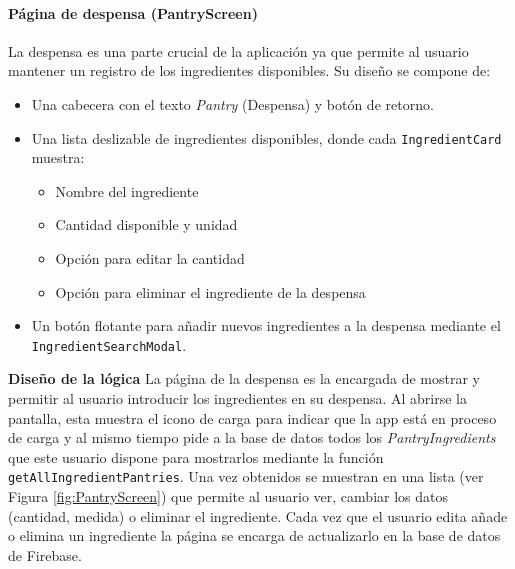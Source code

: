 \documentclass[twoside, openright, 11pt]{report}
\begin{document}
				
				\paragraph{Página de despensa (PantryScreen)}
				La despensa es una parte crucial de la aplicación ya que permite al usuario mantener un registro de los ingredientes disponibles. Su diseño se compone de:
				
				\begin{itemize}
					\item Una cabecera con el texto \textit{Pantry} (Despensa) y botón de retorno.
					\item Una lista deslizable de ingredientes disponibles, donde cada \texttt{IngredientCard} muestra:
					\begin{itemize}
						\item Nombre del ingrediente
						\item Cantidad disponible y unidad
						\item Opción para editar la cantidad
						\item Opción para eliminar el ingrediente de la despensa
					\end{itemize}
					\item Un botón flotante para añadir nuevos ingredientes a la despensa mediante el \texttt{IngredientSearchModal}.
				\end{itemize}
				
				\textbf{Diseño de la lógica}
				La página de la despensa es la encargada de mostrar y permitir al usuario introducir los ingredientes en su despensa. 
				Al abrirse la pantalla, esta muestra el icono de carga para indicar que la app está en proceso de carga y al mismo tiempo pide a la base de datos todos los \textit{PantryIngredients} que este usuario dispone para mostrarlos mediante la función \texttt{getAllIngredientPantries}. Una vez obtenidos se muestran en una lista (ver Figura \ref{fig:PantryScreen}) que permite al usuario ver, cambiar los datos (cantidad, medida) o eliminar el ingrediente.
				Cada vez que el usuario edita añade o elimina un ingrediente la página se encarga de actualizarlo en la base de datos de Firebase.
				
\end{document}
